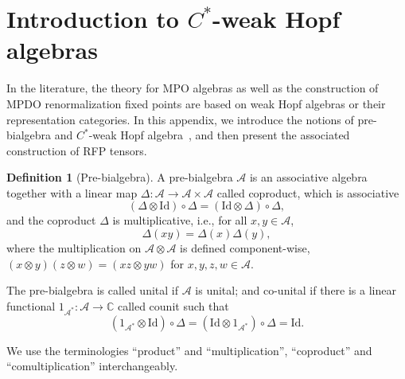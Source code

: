 \documentclass[prx, twocolumn, superscriptaddress, dvipsnames]{revtex4-2}
\theoremstyle{definition}
\newtheorem{defn}[thm]{Definition}
\newcommand{\ra}{\rightarrow}
\newcommand{\mA}{\mathcal{A}}
\newcommand{\Id}{\text{Id}}
\newcommand{\cu}{1_{\mA^*}}
\begin{document}
\section{Introduction to $C^*$-weak Hopf algebras}
\label{app:intro-algebra}


In the literature, the theory for MPO algebras as well as the construction of MPDO renormalization fixed points are based on weak Hopf algebras or their representation categories. 
In this appendix, we introduce the notions of pre-bialgebra and $C^*$-weak Hopf algebra~\cite{bohm_coassociativec_1996,bohm_weak_1999,bohm_weak_2000}, and then present the associated construction of RFP tensors. 

\begin{defn}[Pre-bialgebra]
    A pre-bialgebra $\mA$ is an associative algebra together with a linear map $\Delta:\mA\ra \mA\times \mA$ called coproduct, which is associative
    \begin{equation}
    \label{eqn:coproduct-associative}
        (\Delta\otimes \Id)\circ\Delta = (\Id\otimes \Delta)\circ\Delta,
    \end{equation}
    and the coproduct $\Delta$ is multiplicative, i.e., for all $x,y\in\mA$,
    \begin{equation}
        \Delta(xy)=\Delta(x)\Delta(y),
    \end{equation}
    where the multiplication on $\mA\otimes\mA$ is defined component-wise, $(x\otimes y)(z\otimes w)=(xz\otimes yw)$ for $x,y,z,w\in \mathcal{A}$.

    The pre-bialgebra is called unital if $\mA$ is unital; and co-unital if there is a linear functional $1_{\mA^*}: \mA\ra \mathbb{C}$ called counit such that
    \begin{equation}
        (\cu\otimes\Id)\circ\Delta=(\Id\otimes\cu)\circ\Delta=\Id.
    \end{equation}
\end{defn}

We use the terminologies ``product'' and ``multiplication'', ``coproduct'' and ``comultiplication'' interchangeably. 
\end{document}

